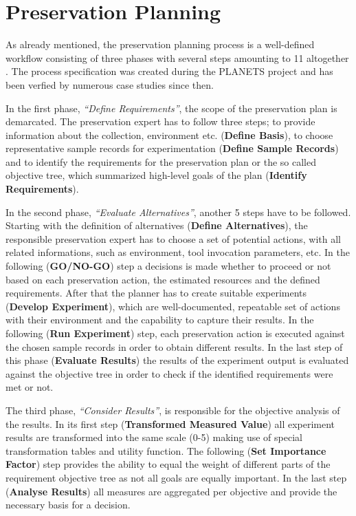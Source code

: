 \section{Preservation Planning}
As already mentioned, the preservation planning process is a well-defined workflow consisting of three phases with several steps amounting to 11 altogether \cite{STR07_jcdl}. The process specification was created during the PLANETS project and has been verfied by numerous case studies since then. 

In the first phase, \textit{``Define Requirements''}, the scope of the preservation plan is demarcated. The preservation expert has to follow three steps; to provide information about the collection, environment etc. (\textbf{Define Basis}), to choose representative sample records for experimentation (\textbf{Define Sample Records}) and to identify the requirements for the preservation plan or the so called objective tree, which summarized high-level goals of the plan (\textbf{Identify Requirements}). 

In the second phase, \textit{``Evaluate Alternatives''}, another 5 steps have to be followed. Starting with the definition of alternatives (\textbf{Define Alternatives}), the responsible preservation expert has to choose a set of potential actions, with all related informations, such as environment, tool invocation parameters, etc. In the following (\textbf{GO/NO-GO}) step a decisions is made whether to proceed or not based on each preservation action, the estimated resources and the defined requirements. After that the planner has to create suitable experiments (\textbf{Develop Experiment}), which are well-documented, repeatable set of actions with their environment and the capability to capture their results. In the following (\textbf{Run Experiment}) step, each preservation action is executed against the chosen sample records in order to obtain different results. In the last step of this phase (\textbf{Evaluate Results}) the results of the experiment output is evaluated against the objective tree in order to check if the identified requirements were met or not.

The third phase, \textit{``Consider Results''}, is responsible for the objective analysis of the results. In its first step (\textbf{Transformed Measured Value}) all experiment results are transformed into the same scale (0-5) making use of special transformation tables and utility function. The following (\textbf{Set Importance Factor}) step provides the ability to equal the weight of different parts of the requirement objective tree as not all goals are equally important. In the last step (\textbf{Analyse Results}) all measures are aggregated per objective and provide the necessary basis for a decision.

